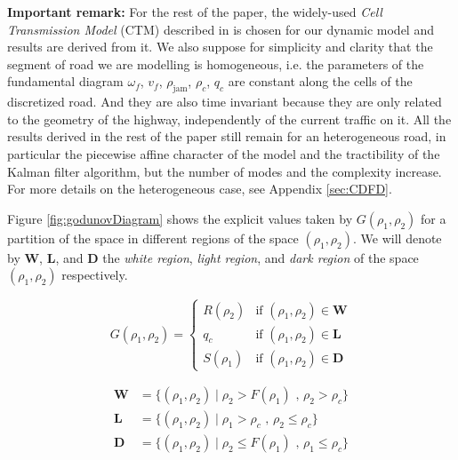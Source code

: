 \documentclass[11pt]{article}
\numberwithin{equation}{section}
\numberwithin{figure}{section}
\numberwithin{table}{section}
\begin{document}
\hspace{10mm}

\noindent\textbf{Important remark:} For the rest of the paper, the widely-used \textit{Cell Transmission Model} (CTM) described in \cite{Daganzo1994} is chosen for our dynamic model and results are derived from it. We also suppose for simplicity and clarity that the segment of road we are modelling is homogeneous, i.e. the parameters of the fundamental diagram $\omega_{f}$, $v_{f}$, $\rho_{\text{jam}}$, $\rho_{c}$, $q_{c}$ are constant along the cells of the discretized road. And they are also time invariant because they are only related to the geometry of the highway, independently of the current traffic on it. All the results derived in the rest of the paper still remain for an heterogeneous road, in particular the piecewise affine character of the model and the tractibility of the Kalman filter algorithm, but the number of modes and the complexity increase. For more details on the heterogeneous case, see Appendix \ref{sec:CDFD}.

\hspace{10mm}

\noindent Figure \ref{fig:godunovDiagram} shows the explicit values taken by $G(\rho_{1},\rho_{2})$ for a partition of the space in different regions of the space $(\rho_{1},\rho_{2})$. We will denote by \textbf{W}, \textbf{L}, and \textbf{D} the \textit{white region}, \textit{light region}, and \textit{dark region} of the space $(\rho_{1},\rho_{2})$ respectively. 

\begin{equation}
G(\rho_{1},\rho_{2}) = \begin{cases}
R(\rho_{2}) & \text{if } (\rho_{1},\rho_{2}) \in \textbf{W}\\
q_{c} & \text{if } (\rho_{1},\rho_{2}) \in \textbf{L}\\
S(\rho_{1}) & \text{if } (\rho_{1},\rho_{2}) \in \textbf{D}
\end{cases}
\label{eq:rhoGodunovFlux}
\end{equation}

\begin{equation}
\begin{array}{ll}
\textbf{W} & = \{(\rho_{1},\rho_{2}) \mid \rho_{2} > F(\rho_{1}) \text{ ,   } \rho_{2} > \rho_{c}\}\\
\textbf{L} & = \{(\rho_{1},\rho_{2}) \mid \rho_{1} > \rho_{c} \text{ ,   } \rho_{2} \leq \rho_{c}\}\\
\textbf{D} & = \{(\rho_{1},\rho_{2}) \mid \rho_{2} \leq F(\rho_{1}) \text{ ,   } \rho_{1} \leq \rho_{c}\}
\end{array}
\label{eq:regions}
\end{equation}
\end{document}
